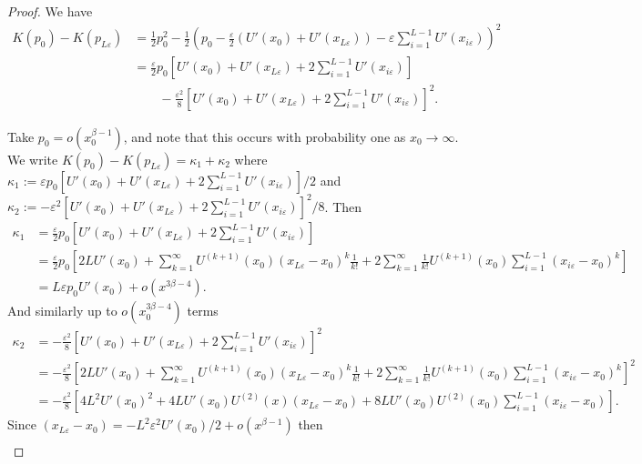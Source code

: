\documentclass[bj,numbers,noshowframe]{imsart}
\theoremstyle{definition}
\theoremstyle{plain}
\theoremstyle{definition}
\begin{document}
\begin{proof}
We have
\begin{align*}
K(p_{0})-K(p_{L\varepsilon}) & =\frac{1}{2}p_{0}^{2}-\frac{1}{2}\left(p_{0}-\frac{\varepsilon}{2}(U'(x_{0})+U'(x_{L\varepsilon}))-\varepsilon\sum_{i=1}^{L-1}U'(x_{i\varepsilon})\right)^{2}\\
 & =\frac{\varepsilon}{2}p_{0}\left[U'(x_{0})+U'(x_{L\varepsilon})+2\sum_{i=1}^{L-1}U'(x_{i\varepsilon})\right]\\
 & \qquad -\frac{\varepsilon^{2}}{8}\left[U'(x_{0})+U'(x_{L\varepsilon})+2\sum_{i=1}^{L-1}U'(x_{i\varepsilon})\right]^{2}.
\end{align*}

Take $p_{0}=o(x_{0}^{\beta-1})$, and note that this occurs with probability
one as $x_{0}\to\infty$. We write $K(p_{0})-K(p_{L\varepsilon})=\kappa_{1}+\kappa_{2}$
where $\kappa_{1}:=\varepsilon p_{0}\left[U'(x_{0})+U'(x_{L\varepsilon})+2\sum_{i=1}^{L-1}U'(x_{i\varepsilon})\right]/2$
and $\kappa_{2}:=-\varepsilon^{2}\left[U'(x_{0})+U'(x_{L\varepsilon})+2\sum_{i=1}^{L-1}U'(x_{i\varepsilon})\right]^{2}/8$.
Then
\begin{align*}
\kappa_{1} & =\frac{\varepsilon}{2}p_{0}\left[U'(x_{0})+U'(x_{L\varepsilon})+2\sum_{i=1}^{L-1}U'(x_{i\varepsilon})\right]\\
 & =\frac{\varepsilon}{2}p_{0}\left[2LU'(x_{0})+\sum_{k=1}^{\infty}U^{(k+1)}(x_{0})(x_{L\varepsilon}-x_{0})^{k}\frac{1}{k!}+2\sum_{k=1}^{\infty}\frac{1}{k!}U^{(k+1)}(x_{0})\sum_{i=1}^{L-1}(x_{i\varepsilon}-x_{0})^{k}\right]\\
 & =L\varepsilon p_{0}U'(x_{0})+o(x^{3\beta-4}).
\end{align*}
And similarly up to $o(x_{0}^{3\beta-4})$ terms
\begin{align*}
\kappa_{2} & =-\frac{\varepsilon^{2}}{8}\left[U'(x_{0})+U'(x_{L\varepsilon})+2\sum_{i=1}^{L-1}U'(x_{i\varepsilon})\right]^{2}\\
 & =-\frac{\varepsilon^{2}}{8}\left[2LU'(x_{0})+\sum_{k=1}^{\infty}U^{(k+1)}(x_{0})(x_{L\varepsilon}-x_{0})^{k}\frac{1}{k!}+2\sum_{k=1}^{\infty}\frac{1}{k!}U^{(k+1)}(x_{0})\sum_{i=1}^{L-1}(x_{i\varepsilon}-x_{0})^{k}\right]^{2}\\
 & =-\frac{\varepsilon^{2}}{8}\left[4L^{2}U'(x_{0})^{2}+4LU'(x_{0})U^{(2)}(x)(x_{L\varepsilon}-x_{0})+8LU'(x_{0})U^{(2)}(x_{0})\sum_{i=1}^{L-1}(x_{i\varepsilon}-x_{0})\right].
\end{align*}
Since $(x_{L\varepsilon}-x_{0})=-L^{2}\varepsilon^{2}U'(x_{0})/2+o(x^{\beta-1})$
then
\begin{align*}

\end{align*}
\end{proof}
\end{document}
